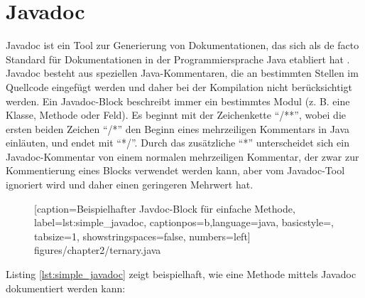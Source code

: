 \section{Javadoc}\label{chapter:javadoc}
Javadoc \cite{HowtoWriteDocCommentsfortheJavadocTool} ist ein Tool zur Generierung von Dokumentationen, das sich als de facto Standard für Dokumentationen in der Programmiersprache Java etabliert hat \cite[S.~249]{JavadocViolationsandTheirEvolutioninOpen-SourceSoftware}.  Javadoc besteht aus speziellen Java-Kommentaren, die an bestimmten Stellen im Quellcode eingefügt werden und daher bei der Kompilation nicht berücksichtigt werden. Ein Javadoc-Block beschreibt immer ein bestimmtes Modul (z. B. eine Klasse, Methode oder Feld). Es beginnt mit der Zeichenkette \enquote{/**}, wobei die ersten beiden Zeichen \enquote{/*} den Beginn eines mehrzeiligen Kommentars in Java einläuten, und endet mit \enquote{*/}. Durch das zusätzliche \enquote{*} unterscheidet sich ein Javadoc-Kommentar von einem normalen mehrzeiligen Kommentar, der zwar zur Kommentierung eines Blocks verwendet werden kann, aber vom Javadoc-Tool ignoriert wird und daher einen geringeren Mehrwert hat. 


		\begin{figure}[ht!]
			
			[caption={Beispielhafter Javdoc-Block für einfache Methode},
			label={lst:simple_javadoc},
			captionpos=b,language=java, basicstyle=\footnotesize, tabsize=1, showstringspaces=false,  numbers=left]
			{figures/chapter2/ternary.java}
		\end{figure}

Listing \ref{lst:simple_javadoc} zeigt beispielhaft, wie eine Methode mittels Javadoc dokumentiert werden kann:

		
		
